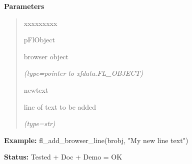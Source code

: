 \begin{boxedminipage}{\funcwidth}
\setlength{\parskip}{1ex}
      \textbf{Parameters}
      \vspace{-1ex}

      \begin{quote}
        \begin{Ventry}{xxxxxxxxx}

          \item[pFlObject]

          browser object

            {\it (type=pointer to xfdata.FL\_OBJECT)}

          \item[newtext]

          line of text to be added

            {\it (type=str)}

        \end{Ventry}

      \end{quote}

\textbf{Example:} fl\_add\_browser\_line(brobj, "My new line text")



\textbf{Status:} Tested + Doc + Demo = OK



    \end{boxedminipage}

    \label{xformslib:flbrowser:fl_addto_browser}

    \vspace{0.5ex}

